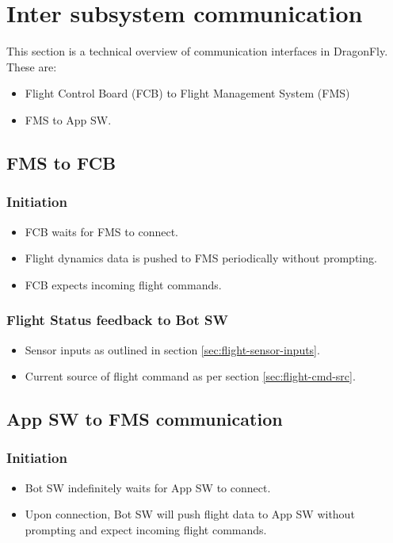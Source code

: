 \documentclass[a4paper]{article}
\begin{document}
\section{Inter subsystem communication}
This section is a technical overview of communication interfaces in DragonFly. These are:
\begin{itemize}
  \item Flight Control Board (FCB) to Flight Management System (FMS)
  \item FMS to App SW.
 \end{itemize}

\subsection{FMS to FCB}

\subsubsection{Initiation}
\begin{itemize}
\item FCB waits for FMS to connect.
\item Flight dynamics data is pushed to FMS periodically without prompting.
\item FCB expects incoming flight commands.
\end{itemize}

\subsubsection{Flight Status feedback to Bot SW}
\begin{itemize}
\item Sensor inputs as outlined in section \ref{sec:flight-sensor-inputs}.
\item Current source of flight command as per section \ref{sec:flight-cmd-src}.
\end{itemize}


\subsection{App SW to FMS communication}
\subsubsection{Initiation}
\begin{itemize}
\item Bot SW indefinitely waits for App SW to connect.
\item Upon connection, Bot SW will push flight data to App SW without prompting and expect incoming flight commands.
\end{itemize}
\end{document}
